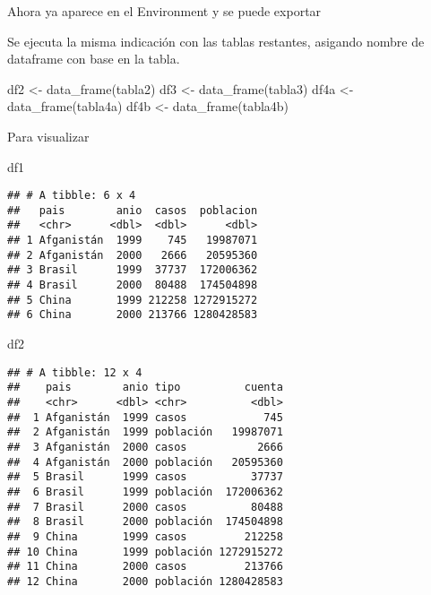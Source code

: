 \documentclass[
]{article}
\newenvironment{Shaded}{\begin{snugshade}}{\end{snugshade}}
\newcommand{\FunctionTok}[1]{\textcolor[rgb]{0.00,0.00,0.00}{#1}}
\newcommand{\NormalTok}[1]{#1}
\newcommand{\OtherTok}[1]{\textcolor[rgb]{0.56,0.35,0.01}{#1}}
\begin{document}
Ahora ya aparece en el Environment y se puede exportar

Se ejecuta la misma indicación con las tablas restantes, asigando nombre
de dataframe con base en la tabla.

\begin{Shaded}
\begin{Highlighting}[]
\NormalTok{df2 }\OtherTok{\textless{}{-}} \FunctionTok{data\_frame}\NormalTok{(tabla2)}
\NormalTok{df3 }\OtherTok{\textless{}{-}} \FunctionTok{data\_frame}\NormalTok{(tabla3)}
\NormalTok{df4a }\OtherTok{\textless{}{-}} \FunctionTok{data\_frame}\NormalTok{(tabla4a)}
\NormalTok{df4b }\OtherTok{\textless{}{-}} \FunctionTok{data\_frame}\NormalTok{(tabla4b)}
\end{Highlighting}
\end{Shaded}

Para visualizar

\begin{Shaded}
\begin{Highlighting}[]
\NormalTok{df1}
\end{Highlighting}
\end{Shaded}

\begin{verbatim}
## # A tibble: 6 x 4
##   pais        anio  casos  poblacion
##   <chr>      <dbl>  <dbl>      <dbl>
## 1 Afganistán  1999    745   19987071
## 2 Afganistán  2000   2666   20595360
## 3 Brasil      1999  37737  172006362
## 4 Brasil      2000  80488  174504898
## 5 China       1999 212258 1272915272
## 6 China       2000 213766 1280428583
\end{verbatim}

\begin{Shaded}
\begin{Highlighting}[]
\NormalTok{df2}
\end{Highlighting}
\end{Shaded}

\begin{verbatim}
## # A tibble: 12 x 4
##    pais        anio tipo          cuenta
##    <chr>      <dbl> <chr>          <dbl>
##  1 Afganistán  1999 casos            745
##  2 Afganistán  1999 población   19987071
##  3 Afganistán  2000 casos           2666
##  4 Afganistán  2000 población   20595360
##  5 Brasil      1999 casos          37737
##  6 Brasil      1999 población  172006362
##  7 Brasil      2000 casos          80488
##  8 Brasil      2000 población  174504898
##  9 China       1999 casos         212258
## 10 China       1999 población 1272915272
## 11 China       2000 casos         213766
## 12 China       2000 población 1280428583
\end{verbatim}
\end{document}

